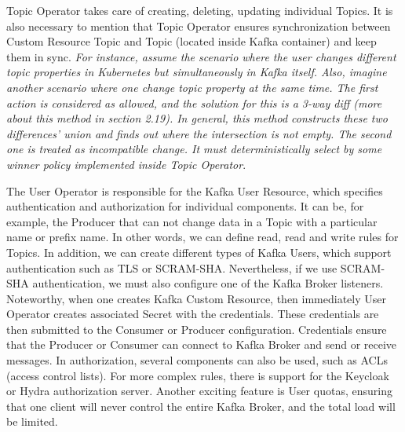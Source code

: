 Topic Operator takes care of creating, deleting, updating individual Topics. It is also necessary to mention that Topic Operator ensures synchronization between Custom Resource Topic and Topic (located inside Kafka container) and keep them in sync. \emph{For
instance, assume the scenario where the user changes different topic properties in Kubernetes
but simultaneously in Kafka itself. Also, imagine another scenario where one change topic property at the same time. The first action is considered as allowed, and the solution for this is a 3-way diff (more about this method in section 2.19). In general, this method constructs these two differences' union and finds out where the intersection is not empty. The second one is treated as incompatible change. It must deterministically select by some winner policy implemented inside Topic Operator}.

The User Operator is responsible for the Kafka User Resource, which specifies authentication and authorization for individual components. It can be, for example, the Producer that can not change data in a Topic with a particular name or prefix name. In other words, we can define read, read and write rules for Topics. In addition, we can create different types of Kafka Users, which support authentication such as TLS or SCRAM-SHA. Nevertheless, if we use SCRAM-SHA authentication, we must also configure one of the Kafka Broker listeners. Noteworthy, when one creates Kafka Custom Resource, then immediately User Operator creates associated Secret with the credentials. These credentials are then submitted to the Consumer or Producer configuration. Credentials ensure that the Producer or Consumer can connect to Kafka Broker and send or receive messages. In authorization, several components can also be used, such as ACLs (access control lists). For more complex rules, there is support for the Keycloak or Hydra authorization server. Another exciting feature is User quotas, ensuring that one client will never control the entire Kafka Broker, and the total load will be limited.



